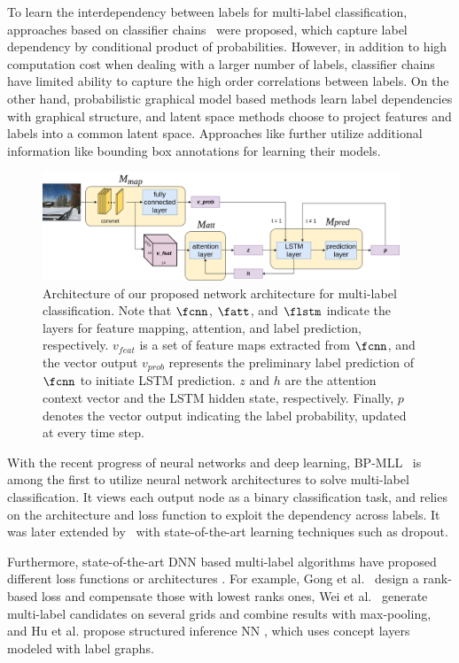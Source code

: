 \documentclass[letterpaper]{article} %
\begin{document}
To learn the interdependency between labels for multi-label classification, approaches based on classifier chains~\cite{read2011classifier} were proposed, which capture label dependency by conditional product of probabilities. However, in addition to high computation cost when dealing with a larger number of labels, classifier chains have limited ability to capture the high order correlations between labels. On the other hand, probabilistic graphical model based methods  \cite{li2014multi,li2016conditional} learn label dependencies with graphical structure, and latent space methods \cite{yeh2017learning,bhatia2015sparse} choose to project features and labels into a common latent space. Approaches like \cite{yang2016exploit} further utilize additional information like bounding box annotations for learning their models.

\begin{figure}[t!]
\centering
\includegraphics[width=0.95\textwidth]{./AAAI.png}
\caption{Architecture of our proposed network architecture for multi-label classification. Note that $\fcnn$, $\fatt$, and $\flstm$ indicate the layers for feature mapping, attention, and label prediction, respectively. $v_{feat}$ is a set of feature maps extracted from $\fcnn$, and the vector output $v_{prob}$ represents the preliminary label prediction of $\fcnn$ to initiate LSTM prediction. $z$ and $h$ are the attention context vector and the LSTM hidden state, respectively. Finally, $p$ denotes the vector output indicating the label probability, updated at every time step.}
\label{fig:2}
\end{figure}

With the recent progress of neural networks and deep learning, BP-MLL~\cite{zhang2006multilabel} is among the first to utilize neural network architectures to solve multi-label classification. It views each output node as a binary classification task, and relies on the architecture and loss function to exploit the dependency across labels. It was later extended by~\cite{nam2014large} with state-of-the-art learning techniques such as dropout.

Furthermore, state-of-the-art DNN based multi-label algorithms have proposed different loss functions or architectures \cite{gong2013deep,wei2014cnn,hu2016learning}. For example, Gong et al.~\cite{gong2013deep} design a rank-based loss and compensate those with lowest ranks ones, Wei et al.~\cite{wei2014cnn} generate multi-label candidates on several grids and combine results with max-pooling, and Hu et al. propose structured inference NN \cite{hu2016learning}, which uses concept layers modeled with label graphs.
\end{document}
